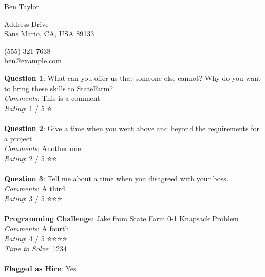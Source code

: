 \documentclass[12pt]{article}
\begin{document}
{\LARGE \begin{center}Ben Taylor\end{center}}

\begin{multicols}{2}
 Address Drive \\
Sans Mario, CA, USA 89133
\columnbreak

\noindent
(555) 321-7638 \\
ben@example.com
\end{multicols}

\noindent
\textbf{Question 1}: What can you offer us that someone else cannot? Why do you want to bring these skills to StateFarm?
\\\noindent
\textit{Comments}: This is a comment
\\\noindent
\textit{Rating}: 1 / 5 ⭐️
\\\\
\noindent
\textbf{Question 2}: Give a time when you went above and beyond the requirements for a project.
\\\noindent
\textit{Comments}: Another  one
\\\noindent
\textit{Rating}: 2 / 5 ⭐️⭐️
\\\\
\noindent
\textbf{Question 3}: Tell me about a time when you disagreed with your boss.
\\\noindent
\textit{Comments}: A third
\\\noindent
\textit{Rating}: 3 / 5 ⭐️⭐️⭐️
\\\\
\noindent
\textbf{Programming Challenge}: Jake from State Farm 0-1 Knapsack Problem
\\\noindent
\textit{Comments}: A fourth
\\\noindent
\textit{Rating}: 4 / 5 ⭐️⭐️⭐️⭐️
\\\noindent
\textit{Time to Solve}: 1234
\\\\
\textbf{Flagged as Hire}: Yes
\\\\ 
\end{document}
